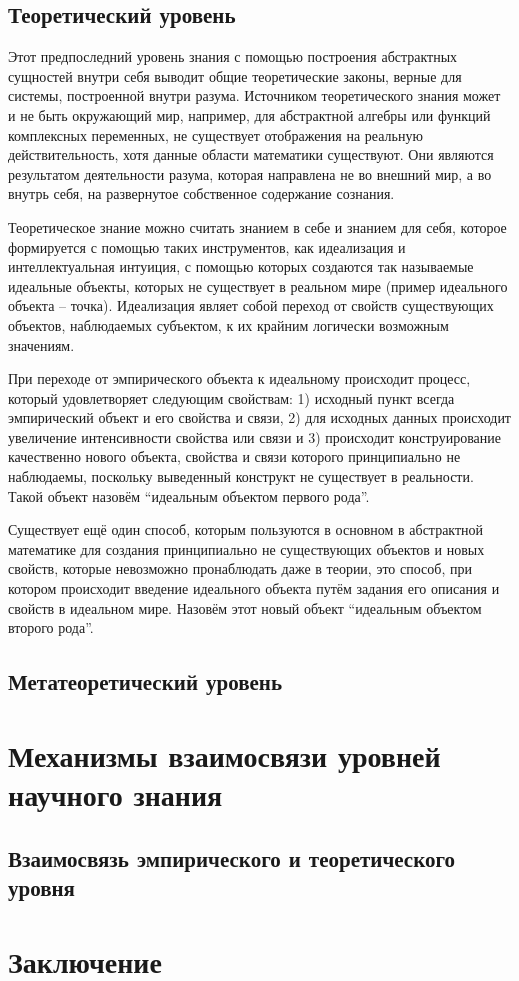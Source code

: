\documentclass[14pt]{article}
\begin{document}
\subsection{Теоретический уровень}
Этот предпоследний уровень знания с помощью построения абстрактных сущностей внутри себя выводит общие теоретические законы, верные для системы, построенной внутри разума. Источником теоретического знания может и не быть окружающий мир, например, для абстрактной алгебры или функций комплексных переменных, не существует отображения на реальную действительность, хотя данные области математики существуют. Они являются результатом деятельности разума, которая направлена не во внешний мир, а во внутрь себя, на развернутое собственное содержание сознания. 

Теоретическое знание можно считать знанием в себе и знанием для себя, которое формируется с помощью таких инструментов, как идеализация и интеллектуальная интуиция, с помощью которых создаются так называемые идеальные объекты, которых не существует в реальном мире (пример идеального объекта -- точка). Идеализация являет собой переход от свойств существующих объектов, наблюдаемых субъектом, к их крайним логически возможным значениям. 

При переходе от эмпирического объекта к идеальному происходит процесс, который удовлетворяет следующим свойствам: 1) исходный пункт всегда эмпирический объект и его свойства и связи, 2) для исходных данных происходит увеличение интенсивности свойства или связи и 3) происходит конструирование качественно нового объекта, свойства и связи которого принципиально не наблюдаемы, поскольку выведенный конструкт не существует в реальности. Такой объект назовём ``идеальным объектом первого рода''.

Существует ещё один способ, которым пользуются в основном в абстрактной математике для создания принципиально не существующих объектов и новых свойств, которые невозможно пронаблюдать даже в теории, это способ, при котором происходит введение идеального объекта путём задания его описания и свойств в идеальном мире. Назовём этот новый объект ``идеальным объектом второго рода''.
\subsection{Метатеоретический уровень}
\section{Механизмы взаимосвязи уровней научного знания}
\subsection{Взаимосвязь эмпирического и теоретического уровня}
\section{Заключение}
\end{document}
